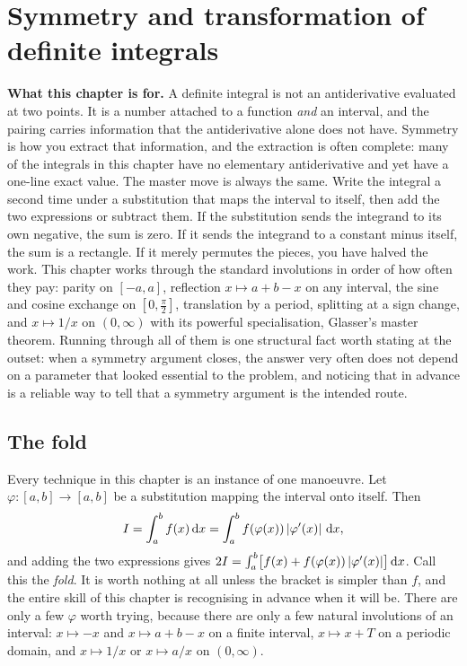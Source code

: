 \chapter{Symmetry and transformation of definite integrals}

\begin{orient}
\textbf{What this chapter is for.} A definite integral is not an antiderivative evaluated at two points. It is a number attached to a function \emph{and} an interval, and the pairing carries information that the antiderivative alone does not have. Symmetry is how you extract that information, and the extraction is often complete: many of the integrals in this chapter have no elementary antiderivative and yet have a one-line exact value. The master move is always the same. Write the integral a second time under a substitution that maps the interval to itself, then add the two expressions or subtract them. If the substitution sends the integrand to its own negative, the sum is zero. If it sends the integrand to a constant minus itself, the sum is a rectangle. If it merely permutes the pieces, you have halved the work. This chapter works through the standard involutions in order of how often they pay: parity on $[-a,a]$, reflection $x\mapsto a+b-x$ on any interval, the sine and cosine exchange on $[0,\tfrac{\pi}{2}]$, translation by a period, splitting at a sign change, and $x\mapsto1/x$ on $(0,\infty)$ with its powerful specialisation, Glasser's master theorem. Running through all of them is one structural fact worth stating at the outset: when a symmetry argument closes, the answer very often does not depend on a parameter that looked essential to the problem, and noticing that in advance is a reliable way to tell that a symmetry argument is the intended route.
\end{orient}

\section{The fold}

Every technique in this chapter is an instance of one manoeuvre. Let $\varphi:[a,b]\to[a,b]$ be a substitution mapping the interval onto itself. Then
\[I=\int_a^bf(x)\,\mathrm{d} x=\int_a^bf(\varphi(x))\left\lvert \varphi'(x)\right\rvert\,\mathrm{d} x,\]
and adding the two expressions gives $2I=\int_a^b\bigl[f(x)+f(\varphi(x))\left\lvert \varphi'(x)\right\rvert\bigr]\,\mathrm{d} x$. Call this the \emph{fold}. It is worth nothing at all unless the bracket is simpler than $f$, and the entire skill of this chapter is recognising in advance when it will be. There are only a few $\varphi$ worth trying, because there are only a few natural involutions of an interval: $x\mapsto-x$ and $x\mapsto a+b-x$ on a finite interval, $x\mapsto x+T$ on a periodic domain, and $x\mapsto1/x$ or $x\mapsto a/x$ on $(0,\infty)$.

